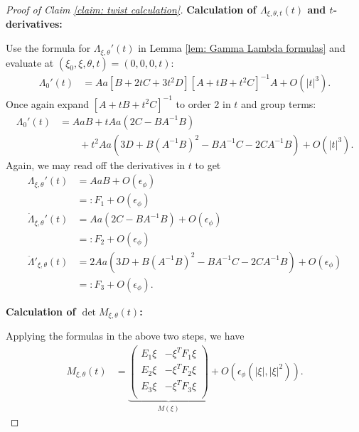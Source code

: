 \documentclass[12pt]{amsart}
\numberwithin{equation}{section}
\newcommand{\1}{\mathbbm{1}}
\begin{document}
\begin{proof}[Proof of Claim \ref{claim: twist calculation}]
    \noindent \textbf{Calculation of $\Lambda_{\xi,\theta,t}(t)$ and $t$-derivatives:}

    Use the formula for $\Lambda_{\xi,\theta}'(t)$ in Lemma \ref{lem: Gamma Lambda formulas} and evaluate at $(\xi_0,\xi,\theta,t) = (0,0,0,t)$: 
    \begin{align}
        \Lambda_{0}'(t) &= Aa[B + 2tC + 3t^2 D][A + tB + t^2 C]^{-1} A + O(|t|^3). 
    \end{align}
    Once again expand $[A + tB  +t^2 C]^{-1}$ to order 2 in $t$ and group terms: 
    \begin{align}
        \Lambda_{0}'(t) &= AaB + tAa(2C - BA^{-1}B) \\&\qquad + t^2Aa(3D + B(A^{-1} B)^2 - BA^{-1} C - 2CA^{-1} B) + O(|t|^3).\nonumber
    \end{align}
    Again, we may read off the derivatives in $t$ to get 
    \begin{align}
        \Lambda_{\xi,\theta}'(t) &= AaB + O(\epsilon_\phi) \\
        &=: F_1 + O(\epsilon_\phi) \\
        \dot \Lambda_{\xi,\theta}'(t) &= Aa(2C - BA^{-1}B) + O(\epsilon_\phi) \\
        &=: F_2 + O(\epsilon_\phi) \\
        \ddot \Lambda'_{\xi,\theta}(t) &= 2Aa(3D + B(A^{-1} B)^2 - BA^{-1} C - 2CA^{-1} B) + O(\epsilon_\phi)\\
        &=: F_3 + O(\epsilon_\phi).
    \end{align}

    \noindent \textbf{Calculation of $\det M_{\xi,\theta}(t)$:}
        
    Applying the formulas in the above two steps, we have 
    \begin{align}\label{eq: twist phi final expr}
        M_{\xi,\theta}(t) &= 
        \underbrace{
        \begin{pmatrix}
            E_1 \xi & -\xi^T F_1 \xi \\
            E_2 \xi & -\xi^T F_2 \xi \\
            E_3 \xi & -\xi^T F_3 \xi \\
        \end{pmatrix}}_{M(\xi)}
        + O(\epsilon_\phi(|\xi|, |\xi|^2)).
    \end{align}


\end{proof}
\end{document}
